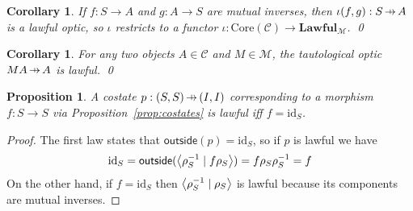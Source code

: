 \documentclass[11pt,letterpaper]{article}
\theoremstyle{plain}
\newtheorem{proposition}[theorem]{Proposition}
\newtheorem{corollary}[theorem]{Corollary}
\theoremstyle{definition}
\newtheorem{remark}[theorem]{Remark}
\newcommand{\C}{\mathscr{C}}
\newcommand{\M}{\mathscr{M}}
\newcommand{\Optic}{\mathbf{Optic}}
\newcommand{\Lawful}{\mathbf{Lawful}}
\newcommand{\id}{\mathrm{id}}
\newcommand{\rep}[2]{{\ensuremath \left\langle #1 \mid #2 \right\rangle}}
\newcommand{\outside}{\mathsf{outside}}
\newcommand{\hto}{\ensuremath{\,\mathaccent\shortmid\rightarrow\,}}
\newcommand{\todo}[1]{\textcolor{red}{\small #1}}
\begin{document}
\begin{corollary}\label{cor:iota-lawful}
  If $f : S \to A$ and $g : A \to S$ are mutual inverses, then $\iota(f, g) : S \hto A$ is a lawful optic, so $\iota$ restricts to a functor $\iota : \mathrm{Core}(\C) \to \Lawful_\M$. \qed
\end{corollary}

\begin{corollary}\label{cor:tautological-lawful}
   For any two objects $A \in \C$ and $M \in \M$, the tautological optic $MA \hto A$ is lawful. \qed
\end{corollary}

\begin{proposition}
A costate $p : (S, S) \hto (I, I)$ corresponding to a morphism $f : S \to S$ via Proposition~\ref{prop:costates} is lawful iff $f = \id_S$.
\end{proposition}
\begin{proof}
The first law states that $\outside(p) = \id_S$, so if $p$ is lawful we have
\[  \id_S = \outside(\rep{\rho_S^{-1}}{f \rho_S}) =  f \rho_S\rho_S^{-1} = f \]
On the other hand, if $f  = \id_S$ then $\rep{\rho_S^{-1}}{\rho_S}$ is lawful because its components are mutual inverses.
\end{proof}

\end{document}
